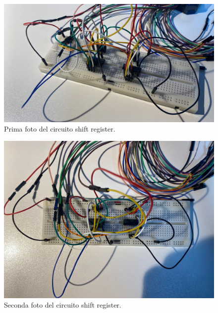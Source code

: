 \documentclass[10pt,a4paper]{article}
\begin{document}
\begin{figure}[htp]
\begin{center}
\includegraphics[scale=0.25]{circuito2.jpeg}
\caption{Prima foto del circuito shift register.}
\end{center}
\end{figure}

\begin{figure}[htp]
    \begin{center}
    \includegraphics[scale=0.18]{circuitodoppio.jpeg}
    \caption{Seconda foto del circuito shift register.}
    \end{center}
    \end{figure}
\end{document}
